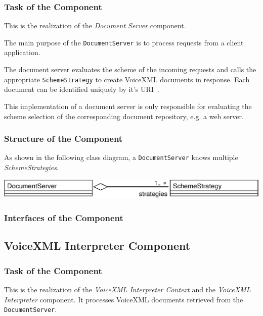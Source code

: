 \documentclass[11pt,a4paper]{article}
\begin{document}
\subsubsection{Task of the Component}

This is the realization of the \emph{Document Server} component.

The main purpose of the \texttt{DocumentServer} is to process requests from a 
client application.

The document server evaluates the scheme of the incoming requests and
calls the appropriate \texttt{SchemeStrategy} to create VoiceXML
documents in response. Each document can be identified uniquely by
it's URI~\cite{w3.org:addressing}.

This implementation of a document server is only responsible for
evaluating the scheme selection of the corresponding document repository,
e.g. a web server.

\subsubsection{Structure of the Component}

As shown in the following class diagram, a \texttt{DocumentServer}
knows multiple \emph{SchemeStrategies}.

\begin{center}
\includegraphics[scale=0.8]{class-documentserver.eps}
\end{center}

\subsubsection{Interfaces of the Component}

\subsection{VoiceXML Interpreter Component}
\label{sec:voic-interpr-comp}

\subsubsection{Task of the Component}

This is the realization of the 
\emph{VoiceXML Interpreter Context} and the \emph{VoiceXML Interpreter}
component. It processes VoiceXML documents retrieved from the
\texttt{DocumentServer}.
\end{document}

